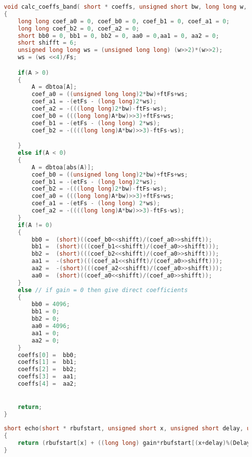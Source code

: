 \begin{lstlisting}[caption={Calculate parametric band pass filter coefficients.},language=C,label={apcode:calc_bp_filt},tabsize=2]
void calc_coeffs_band( short * coeffs, unsigned short bw, long long w, short A)
{
    long long coef_a0 = 0, coef_b0 = 0, coef_b1 = 0, coef_a1 = 0;
    long long coef_b2 = 0, coef_a2 = 0;
    short bb0 = 0, bb1 = 0, bb2 = 0, aa0 = 0,aa1 = 0, aa2 = 0;
    short shifft = 6;
    unsigned long long ws = (unsigned long long) (w>>2)*(w>>2);
    ws = (ws <<4)/Fs;

    if(A > 0)
    {
        A = dbtoa[A];
        coef_a0 = ((unsigned long long)2*bw)+ftFs+ws;
        coef_a1 = -(etFs - (long long)2*ws);
        coef_a2 = -(((long long)2*bw)-ftFs-ws);
        coef_b0 = (((long long)A*bw)>>3)+ftFs+ws;
        coef_b1 = -(etFs - (long long) 2*ws);
        coef_b2 = -((((long long)A*bw)>>3)-ftFs-ws);

    }
    else if(A < 0)
    {
        A = dbtoa[abs(A)];
        coef_b0 = ((unsigned long long)2*bw)+ftFs+ws;
        coef_b1 = -(etFs - (long long)2*ws);
        coef_b2 = -(((long long)2*bw)-ftFs-ws);
        coef_a0 = (((long long)A*bw)>>3)+ftFs+ws;
        coef_a1 = -(etFs - (long long) 2*ws);
        coef_a2 = -((((long long)A*bw)>>3)-ftFs-ws);
    }
    if(A != 0)
    {
        bb0 =  (short)((coef_b0<<shifft)/(coef_a0>>shifft));
        bb1 =  (short)(((coef_b1<<shifft)/(coef_a0>>shifft)));
        bb2 =  (short)(((coef_b2<<shifft)/(coef_a0>>shifft)));
        aa1 =  -(short)(((coef_a1<<shifft)/(coef_a0>>shifft)));
        aa2 =  -(short)(((coef_a2<<shifft)/(coef_a0>>shifft)));
        aa0 =  (short)((coef_a0<<shifft)/(coef_a0>>shifft));
    }
    else // if gain = 0 then give direct coefficients
    {
        bb0 = 4096;
        bb1 = 0;
        bb2 = 0;
        aa0 = 4096;
        aa1 = 0;
        aa2 = 0;
    }
    coeffs[0] =  bb0;
    coeffs[1] =  bb1;
    coeffs[2] =  bb2;
    coeffs[3] =  aa1;
    coeffs[4] =  aa2;


    return;
}
\end{lstlisting}
\begin{lstlisting}[caption={Single delay implementation.},language=C,label={apcode:sdelay},tabsize=2]
short echo(short * rbufstart, unsigned short x, unsigned short delay, unsigned short gain)
{
    return (rbufstart[x] + ((long long) gain*rbufstart[(x+delay)%(DelayBuff)])>>12);
}
\end{lstlisting}


